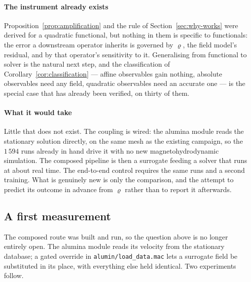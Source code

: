 \documentclass[11pt,a4paper]{article}
\theoremstyle{plain}
\theoremstyle{definition}
\theoremstyle{remark}
\begin{document}
\paragraph{The instrument already exists}
Proposition~\ref{prop:amplification} and the rule of
Section~\ref{sec:why-works} were derived for a quadratic functional, but nothing
in them is specific to functionals: the error a downstream operator inherits is
governed by $\varrho$, the field model's residual, and by that operator's
sensitivity to it. Generalising from functional to solver is the natural next
step, and the classification of Corollary~\ref{cor:classification} --- affine
observables gain nothing, absolute observables need any field, quadratic
observables need an accurate one --- is the special case that has already been
verified, on thirty of them.

\paragraph{What it would take}
Little that does not exist. The coupling is wired: the alumina module reads the
stationary solution directly, on the same mesh as the existing campaign, so the
$1\,594$ runs already in hand drive it with no new magnetohydrodynamic
simulation. The composed pipeline is then a surrogate feeding a solver that runs
at about real time. The end-to-end control requires the same runs and a second
training. What is genuinely new is only the comparison, and the attempt to
predict its outcome in advance from $\varrho$ rather than to report it
afterwards.

\subsection*{A first measurement}
\label{sec:composed-measured}

The composed route was built and run, so the question above is no longer entirely
open. The alumina module reads its velocity from the stationary database; a gated
override in \texttt{alumin/load\_data.mac} lets a surrogate field be substituted
in its place, with everything else held identical. Two experiments follow.
\end{document}

